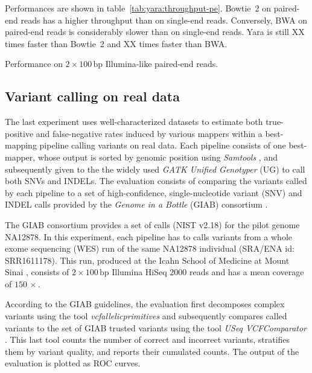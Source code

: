Performances are shown in table~\ref{tab:yara:throughput-pe}.
Bowtie~2 on paired-end reads has a higher throughput than on single-end reads.
Conversely, BWA on paired-end reads is considerably slower than on single-end reads.
Yara is still XX times faster than Bowtie~2 and XX times faster than BWA.

\begin{table}[b]
\begin{center}
\caption[Yara performance on Illumina-like paired-end reads]{Performance on $2 \times 100\,\text{bp}$ Illumina-like paired-end reads.}
\sffamily

\label{tab:yara:throughput-pe}
\end{center}
\end{table}



\subsection{Variant calling on real data}
\label{sec:yara:eval:calling}


The last experiment uses well-characterized datasets to estimate both true-positive and false-negative rates induced by various mappers within a best-mapping pipeline calling variants on real data.
Each pipeline consists of one best-mapper, whose output is sorted by genomic position using \emph{Samtools} \citep{Li2009}, and subsequently given to the the widely used \emph{GATK Unified Genotyper} (UG) \citep{DePristo2011} to call both SNVs and INDELs.
The evaluation consists of comparing the variants called by each pipeline to a set of high-confidence, single-nucleotide variant (SNV) and INDEL calls provided by the \emph{Genome in a Bottle} (GIAB) consortium \citep{Zook2014}.

The GIAB consortium provides a set of calls (NIST v2.18) for the pilot genome NA12878.
In this experiment, each pipeline has to calls variants from a whole exome sequencing (WES) run of the same NA12878 individual (SRA/ENA id: SRR1611178).
This run, produced at the Icahn School of Medicine at Mount Sinai \citep{Linderman2014}, consists of $2 \times 100\,\text{bp}$ Illumina HiSeq 2000 reads and has a mean coverage of $150\, \times$.

According to the GIAB guidelines, the evaluation first decomposes complex variants using the tool \emph{vcfallelicprimitives} \citep{Danecek2011} and subsequently compares called variants to the set of GIAB trusted variants using the tool \emph{USeq VCFComparator} \citep{Nix2008}.
This last tool counts the number of correct and incorrect variants, stratifies them by variant quality, and reports their cumulated counts.
The output of the evaluation is plotted as ROC curves.

